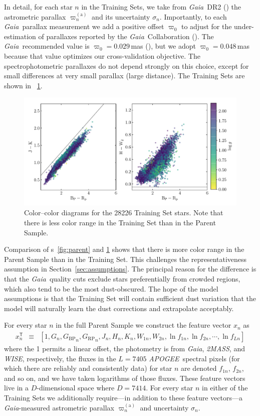 \documentclass[modern]{aastex62}
\newcommand{\sectionname}{Section}
\newcommand{\acronym}[1]{{\small{#1}}}
\newcommand{\project}[1]{\textsl{#1}}
\newcommand{\apogee}{\project{\acronym{APOGEE}}}
\newcommand{\gaia}{\project{Gaia}}
\newcommand{\wise}{\project{\acronym{WISE}}}
\newcommand{\zmass}{\project{\acronym{2MASS}}}
\newcommand{\T}{^{\mathsf{T}}}
\newcommand{\BP}{{G_\mathrm{BP}}}
\newcommand{\RP}{{G_\mathrm{RP}}}
\newcommand{\gparallax}{\varpi^{(\mathrm{a})}}
\begin{document}
In detail,
for each star $n$ in the Training Sets, we take from \gaia\ \acronym{DR2} (\citealt{gaiadr2})
the astrometric parallax $\gparallax_n$ and its uncertainty $\sigma_n$.
Importantly, to each \gaia\ parallax measurement we add a positive
offset $\varpi_0$ to adjust for the under-estimation of
parallaxes reported by the \gaia\ Collaboration (\citealt{lindegren}).
The \gaia\ recommended value is $\varpi_0=0.029$\,mas (\citealt{lindegren}),
but we adopt $\varpi_0 = 0.048$\,mas because that value
optimizes our cross-validation objective.
The spectrophotometric parallaxes do not depend strongly on this choice, except
for small differences at very small parallax (large distance).
The Training Sets are shown in \figurename~\ref{fig:training}.
\begin{figure}
\includegraphics[width=\textwidth]{./training_sample.pdf}
\caption{Color--color diagrams for the 28226 Training Set stars.
  Note that there is less color range in the Training Set than in the
  Parent Sample.\label{fig:training}}
\end{figure}

Comparison of {\figurename s}~\ref{fig:parent} and \ref{fig:training} shows
that there is more color range in the Parent Sample than in the Training Set.
This challenges the representativeness assumption in \sectionname~\ref{sec:assumptions}.
The principal reason for the difference is that the \gaia\ quality cuts
exclude stars preferentially from crowded regions, which also tend to be the
most dust-obscured.
The hope of the model assumptions is that the Training Set will contain sufficient
dust variation that the model will naturally learn the dust corrections and extrapolate
acceptably.

For every star $n$ in the full Parent Sample we construct the feature
vector $x_n$ as
\begin{eqnarray}
x_n\T &\equiv& [1, G_n, \BP_n, \RP_n, J_n, H_n, K_n, W_{1n}, W_{2n}, \ln f_{1n}, \ln f_{2n}, \cdots, \ln f_{Ln}]
\end{eqnarray}
where the 1 permits a linear offset,
the photometry is from \gaia, \zmass, and \wise, respectively,
the fluxes in the $L=7405$ \apogee\ spectral pixels (for which there are reliably
and consistently data) for star $n$ are denoted
$f_{1n}$, $f_{2n}$, and so on,
and we have taken logarithms of those fluxes.
These feature vectors live in a $D$-dimensional space where $D=7414$.
For every star $n$ in either of the Training Sets we additionally require---in
addition to these feature vectors---a \gaia-measured astrometric parallax $\gparallax_n$
and uncertainty $\sigma_n$.
\end{document}
